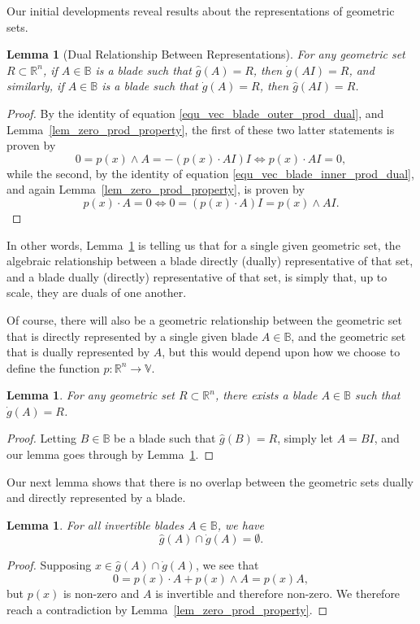 \documentclass{birkjour}
\newtheorem{lem}[thm]{Lemma}
\theoremstyle{definition}
\theoremstyle{remark}
\numberwithin{equation}{section}
\newcommand{\R}{\mathbb{R}}
\newcommand{\B}{\mathbb{B}}
\newcommand{\V}{\mathbb{V}}
\newcommand{\gd}{\dot{g}}
\newcommand{\gh}{\hat{g}}
\begin{document}
Our initial developments reveal results about the representations of geometric sets.

\begin{lem}[Dual Relationship Between Representations]\label{lem_dual_relationship_in_rep}
For any geometric set $R\subset\R^n$, if $A\in\B$ is a blade such that $\gh(A)=R$,
then $\gd(AI)=R$, and similarly, if $A\in\B$ is a blade such that $\gd(A)=R$, then $\gh(AI)=R$.
\end{lem}
\begin{proof}
By the identity of equation \eqref{equ_vec_blade_outer_prod_dual}, and Lemma~\ref{lem_zero_prod_property},
the first of these two latter statements is proven by
\begin{equation}
0=p(x)\wedge A=-(p(x)\cdot AI)I\iff p(x)\cdot AI=0,
\end{equation}
while the second, by the identity of equation \eqref{equ_vec_blade_inner_prod_dual},
and again Lemma~\ref{lem_zero_prod_property}, is proven by
\begin{equation}
p(x)\cdot A=0\iff 0=(p(x)\cdot A)I=p(x)\wedge AI.
\end{equation}
\end{proof}

In other words, Lemma~\ref{lem_dual_relationship_in_rep} is telling us that for a single given geometric set, the
algebraic relationship between a blade directly (dually) representative of that set,
and a blade dually (directly) representative of that set, is simply that, up to scale, they
are duals of one another.

Of course, there will also be a geometric relationship between the geometric set that is directly represented by a single
given blade $A\in\B$, and the geometric set that is dually represented by $A$, but this would depend upon how we choose to define
the function $p:\R^n\to\V$.

\begin{lem}
For any geometric set $R\subset\R^n$, there exists a blade $A\in\B$ such that
$\gd(A)=R$.
\end{lem}
\begin{proof}
Letting $B\in\B$ be a blade such that $\gh(B)=R$, simply let $A=BI$, and our
lemma goes through by Lemma~\ref{lem_dual_relationship_in_rep}.
\end{proof}

Our next lemma shows that there is no overlap between the geometric sets dually and directly
represented by a blade.

\begin{lem}
For all invertible blades $A\in\B$, we have
\begin{equation}
\gh(A)\cap\gd(A)=\emptyset.
\end{equation}
\end{lem}
\begin{proof}
Supposing $x\in\gh(A)\cap\gd(A)$, we see that
\begin{equation}
0 = p(x)\cdot A + p(x)\wedge A = p(x)A,
\end{equation}
but $p(x)$ is non-zero and $A$ is invertible and therefore non-zero.  We therefore reach a
contradiction by Lemma~\ref{lem_zero_prod_property}.
\end{proof}
\end{document}
